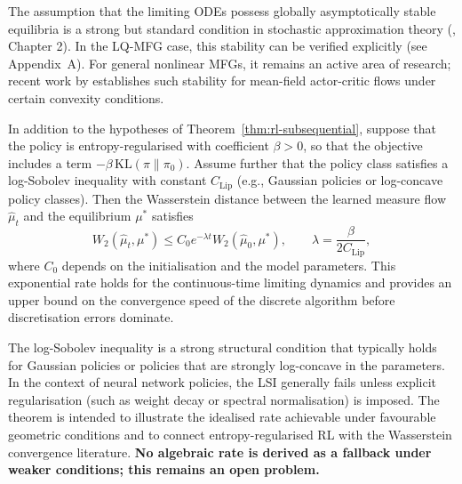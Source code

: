 \begin{remark}
The assumption that the limiting ODEs possess globally asymptotically stable
equilibria is a strong but standard condition in stochastic approximation theory
(\citep{borkar2008}, Chapter 2). In the LQ-MFG case, this stability can be verified
explicitly (see Appendix~A). For general nonlinear MFGs, it remains an active area
of research; recent work by \citep{zhouzhouhu2025} establishes such stability for
mean-field actor-critic flows under certain convexity conditions.
\end{remark}

\begin{theorem}
\label{thm:rl-exponential}
In addition to the hypotheses of Theorem~\ref{thm:rl-subsequential}, suppose that the
policy is entropy-regularised with coefficient $\beta > 0$, so that the objective
includes a term $-\beta\, \mathrm{KL}(\pi \| \pi_0)$. Assume further that the policy
class satisfies a log-Sobolev inequality with constant $C_{\mathrm{Lip}}$ (e.g.,
Gaussian policies or log-concave policy classes). Then the Wasserstein distance
between the learned measure flow $\hat\mu_t$ and the equilibrium $\mu^*$ satisfies
\[
    W_2(\hat\mu_t, \mu^*) \leq C_0 e^{-\lambda t} W_2(\hat\mu_0, \mu^*), \qquad
    \lambda = \frac{\beta}{2 C_{\mathrm{Lip}}},
\]
where $C_0$ depends on the initialisation and the model parameters. This
exponential rate holds for the continuous-time limiting dynamics and provides an
upper bound on the convergence speed of the discrete algorithm before discretisation
errors dominate.
\end{theorem}

\begin{remark}
The log-Sobolev inequality is a strong structural condition that typically holds for
Gaussian policies or policies that are strongly log-concave in the parameters. In the
context of neural network policies, the LSI generally fails unless explicit
regularisation (such as weight decay or spectral normalisation) is imposed. The
theorem is intended to illustrate the idealised rate achievable under favourable
geometric conditions and to connect entropy-regularised RL with the Wasserstein
convergence literature. \textbf{No algebraic rate is derived as a fallback under
weaker conditions; this remains an open problem.}
\end{remark}

